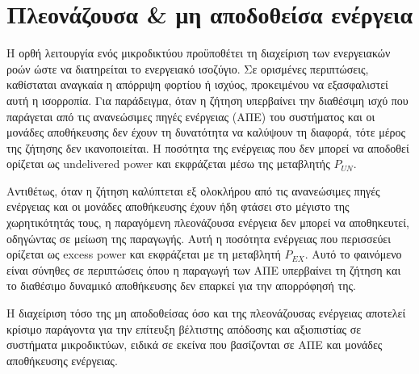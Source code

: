 \section{Πλεονάζουσα \& μη αποδοθείσα ενέργεια}
Η ορθή λειτουργία ενός μικροδικτύου προϋποθέτει τη διαχείριση των ενεργειακών ροών ώστε να διατηρείται το ενεργειακό ισοζύγιο. Σε ορισμένες περιπτώσεις, καθίσταται αναγκαία η απόρριψη φορτίου ή ισχύος, προκειμένου να εξασφαλιστεί αυτή η ισορροπία. Για παράδειγμα, όταν η ζήτηση υπερβαίνει την διαθέσιμη ισχύ που παράγεται από τις ανανεώσιμες πηγές ενέργειας (ΑΠΕ) του συστήματος και οι μονάδες αποθήκευσης δεν έχουν τη δυνατότητα να καλύψουν τη διαφορά, τότε μέρος της ζήτησης δεν ικανοποιείται. Η ποσότητα της ενέργειας που δεν μπορεί να αποδοθεί ορίζεται ως \en undelivered power \gr και εκφράζεται μέσω της μεταβλητής $P_{UN}$.

Αντιθέτως, όταν η ζήτηση καλύπτεται εξ ολοκλήρου από τις ανανεώσιμες πηγές ενέργειας και οι μονάδες αποθήκευσης έχουν ήδη φτάσει στο μέγιστο της χωρητικότητάς τους, η παραγόμενη πλεονάζουσα ενέργεια δεν μπορεί να αποθηκευτεί, οδηγώντας σε μείωση της παραγωγής. Αυτή η ποσότητα ενέργειας που περισσεύει ορίζεται ως \en excess power \gr και εκφράζεται με τη μεταβλητή $P_{EX}$. Αυτό το φαινόμενο είναι σύνηθες σε περιπτώσεις όπου η παραγωγή των ΑΠΕ υπερβαίνει τη ζήτηση και το διαθέσιμο δυναμικό αποθήκευσης δεν επαρκεί για την απορρόφησή της.

Η διαχείριση τόσο της μη αποδοθείσας όσο και της πλεονάζουσας ενέργειας αποτελεί κρίσιμο παράγοντα για την επίτευξη βέλτιστης απόδοσης και αξιοπιστίας σε συστήματα μικροδικτύων, ειδικά σε εκείνα που βασίζονται σε ΑΠΕ και μονάδες αποθήκευσης ενέργειας.






